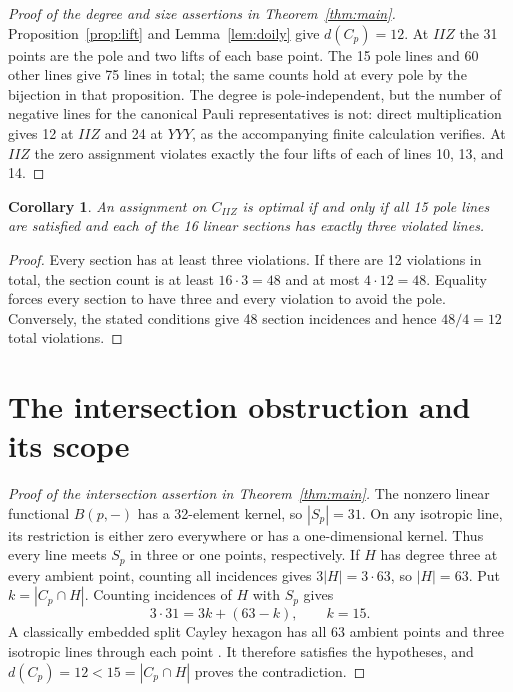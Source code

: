 \documentclass[10pt]{article}
\newtheorem{corollary}[theorem]{Corollary}
\begin{document}
\begin{proof}[Proof of the degree and size assertions in Theorem~\ref{thm:main}]
Proposition~\ref{prop:lift} and Lemma~\ref{lem:doily} give
$d(C_p)=12$. At $IIZ$ the 31 points are the pole and two lifts of each base point.
The 15 pole lines and 60 other lines give 75 lines in total;
the same counts hold at every pole by the bijection in that proposition.
The degree is pole-independent, but the number of negative lines for the
canonical Pauli representatives is not: direct multiplication gives 12 at
$IIZ$ and 24 at $YYY$, as the accompanying finite calculation verifies.
At $IIZ$ the zero assignment violates exactly the four lifts of each of
lines 10, 13, and 14.
\end{proof}

\begin{corollary}\label{cor:optimal}
An assignment on $C_{IIZ}$ is optimal if and only if all 15 pole lines are
satisfied and each of the 16 linear sections has exactly three violated lines.
\end{corollary}
\begin{proof}
Every section has at least three violations. If there are 12 violations in
total, the section count is at least $16\cdot3=48$ and at most
$4\cdot12=48$. Equality forces every section to have three and every
violation to avoid the pole. Conversely, the stated conditions give 48
section incidences and hence $48/4=12$ total violations.
\end{proof}

\section{The intersection obstruction and its scope}
\begin{proof}[Proof of the intersection assertion in Theorem~\ref{thm:main}]
The nonzero linear functional $B(p,-)$ has a 32-element kernel, so
$|S_p|=31$. On any isotropic line, its restriction is either zero everywhere
or has a one-dimensional kernel. Thus every line meets $S_p$ in three or
one points, respectively. If $H$ has degree three at every ambient point,
counting all incidences gives $3|H|=3\cdot63$, so $|H|=63$.
Put $k=|C_p\cap H|$. Counting incidences of $H$ with $S_p$ gives
\[
 3\cdot31=3k+(63-k),\qquad k=15.
\]
A classically embedded split Cayley hexagon has all 63 ambient points and
three isotropic lines through each point
\cite[Section~2, pp.~6--7]{saniga}. It therefore satisfies the hypotheses,
and $d(C_p)=12<15=|C_p\cap H|$ proves the contradiction.
\end{proof}
\end{document}
